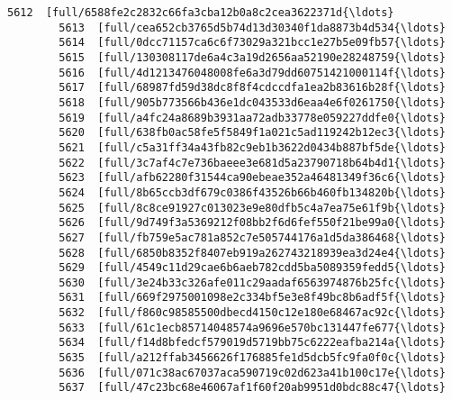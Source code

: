 \documentclass[11pt]{article}
\begin{document}
\begin{Verbatim}[commandchars=\\\{\}]
        5612  [full/6588fe2c2832c66fa3cba12b0a8c2cea3622371d{\ldots}   
        5613  [full/cea652cb3765d5b74d13d30340f1da8873b4d534{\ldots}   
        5614  [full/0dcc71157ca6c6f73029a321bcc1e27b5e09fb57{\ldots}   
        5615  [full/130308117de6a4c3a19d2656aa52190e28248759{\ldots}   
        5616  [full/4d1213476048008fe6a3d79dd60751421000114f{\ldots}   
        5617  [full/68987fd59d38dc8f8f4cdccdfa1ea2b83616b28f{\ldots}   
        5618  [full/905b773566b436e1dc043533d6eaa4e6f0261750{\ldots}   
        5619  [full/a4fc24a8689b3931aa72adb33778e059227ddfe0{\ldots}   
        5620  [full/638fb0ac58fe5f5849f1a021c5ad119242b12ec3{\ldots}   
        5621  [full/c5a31ff34a43fb82c9eb1b3622d0434b887bf5de{\ldots}   
        5622  [full/3c7af4c7e736baeee3e681d5a23790718b64b4d1{\ldots}   
        5623  [full/afb62280f31544ca90ebeae352a46481349f36c6{\ldots}   
        5624  [full/8b65ccb3df679c0386f43526b66b460fb134820b{\ldots}   
        5625  [full/8c8ce91927c013023e9e80dfb5c4a7ea75e61f9b{\ldots}   
        5626  [full/9d749f3a5369212f08bb2f6d6fef550f21be99a0{\ldots}   
        5627  [full/fb759e5ac781a852c7e505744176a1d5da386468{\ldots}   
        5628  [full/6850b8352f8407eb919a262743218939ea3d24e4{\ldots}   
        5629  [full/4549c11d29cae6b6aeb782cdd5ba5089359fedd5{\ldots}   
        5630  [full/3e24b33c326afe011c29aadaf6563974876b25fc{\ldots}   
        5631  [full/669f2975001098e2c334bf5e3e8f49bc8b6adf5f{\ldots}   
        5632  [full/f860c98585500dbecd4150c12e180e68467ac92c{\ldots}   
        5633  [full/61c1ecb85714048574a9696e570bc131447fe677{\ldots}   
        5634  [full/f14d8bfedcf579019d5719bb75c6222eafba214a{\ldots}   
        5635  [full/a212ffab3456626f176885fe1d5dcb5fc9fa0f0c{\ldots}   
        5636  [full/071c38ac67037aca590719c02d623a41b100c17e{\ldots}   
        5637  [full/47c23bc68e46067af1f60f20ab9951d0bdc88c47{\ldots}   
        

\end{Verbatim}
\end{document}
